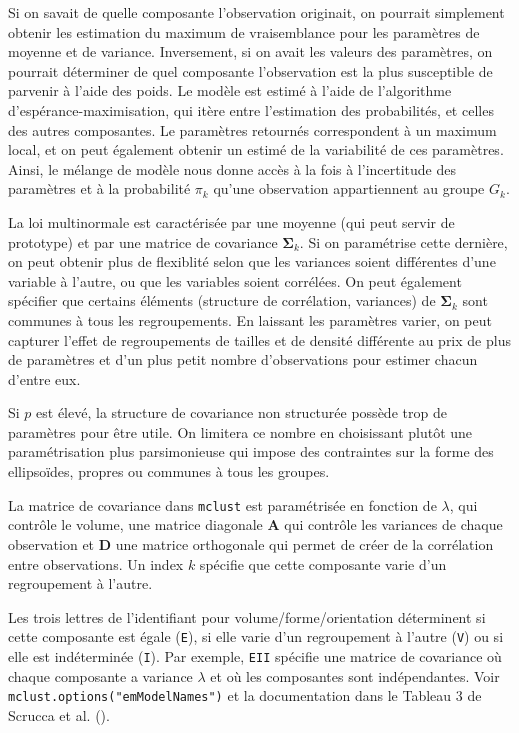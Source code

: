 \documentclass[
  11pt,
  letterpaper,
]{scrbook}
\theoremstyle{definition}
\theoremstyle{remark}
\begin{document}
Si on savait de quelle composante l'observation originait, on pourrait
simplement obtenir les estimation du maximum de vraisemblance pour les
paramètres de moyenne et de variance. Inversement, si on avait les
valeurs des paramètres, on pourrait déterminer de quel composante
l'observation est la plus susceptible de parvenir à l'aide des poids. Le
modèle est estimé à l'aide de l'algorithme d'espérance-maximisation, qui
itère entre l'estimation des probabilités, et celles des autres
composantes. Le paramètres retournés correspondent à un maximum local,
et on peut également obtenir un estimé de la variabilité de ces
paramètres. Ainsi, le mélange de modèle nous donne accès à la fois à
l'incertitude des paramètres et à la probabilité \(\pi_k\) qu'une
observation appartiennent au groupe \(G_k\).

La loi multinormale est caractérisée par une moyenne (qui peut servir de
prototype) et par une matrice de covariance \(\boldsymbol{\Sigma}_k\).
Si on paramétrise cette dernière, on peut obtenir plus de flexiblité
selon que les variances soient différentes d'une variable à l'autre, ou
que les variables soient corrélées. On peut également spécifier que
certains éléments (structure de corrélation, variances) de
\(\boldsymbol{\Sigma}_k\) sont communes à tous les regroupements. En
laissant les paramètres varier, on peut capturer l'effet de
regroupements de tailles et de densité différente au prix de plus de
paramètres et d'un plus petit nombre d'observations pour estimer chacun
d'entre eux.

Si \(p\) est élevé, la structure de covariance non structurée possède
trop de paramètres pour être utile. On limitera ce nombre en choisissant
plutôt une paramétrisation plus parsimonieuse qui impose des contraintes
sur la forme des ellipsoïdes, propres ou communes à tous les groupes.

La matrice de covariance dans \texttt{mclust} est paramétrisée en
fonction de \(\lambda\), qui contrôle le volume, une matrice diagonale
\(\mathbf{A}\) qui contrôle les variances de chaque observation et
\(\mathbf{D}\) une matrice orthogonale qui permet de créer de la
corrélation entre observations. Un index \(k\) spécifie que cette
composante varie d'un regroupement à l'autre.

Les trois lettres de l'identifiant pour volume/forme/orientation
déterminent si cette composante est égale (\texttt{E}), si elle varie
d'un regroupement à l'autre (\texttt{V}) ou si elle est indéterminée
(\texttt{I}). Par exemple, \texttt{EII} spécifie une matrice de
covariance où chaque composante a variance \(\lambda\) et où les
composantes sont indépendantes. Voir
\texttt{mclust.options("emModelNames")} et la documentation dans le
Tableau 3 de Scrucca et al. ().
\end{document}
